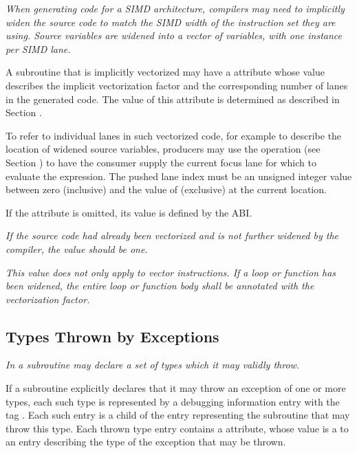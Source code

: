 \textit{When generating code for a SIMD architecture, compilers
may need to implicitly widen the source code to match the SIMD
width of the instruction set they are using. Source variables
are widened into a vector of variables, with one instance per
SIMD lane.}

A subroutine that is implicitly vectorized may have a
\DWATnumlanes{} attribute whose value describes the implicit
vectorization factor and the corresponding number of lanes in
the generated code. The value of this attribute is determined as
described in Section .

To refer to individual lanes in such vectorized code, for example
to describe the location of widened source variables, producers
may use the \DWOPpushlane{} operation (see Section
) to have the consumer supply
the current focus lane for which to evaluate the expression.
The pushed lane index must be an unsigned integer value between
zero (inclusive) and the value of \DWATnumlanes{} (exclusive)
at the current location.

If the attribute is omitted, its value is defined by the ABI.

\textit{If the source code had already been vectorized and is
not further widened by the compiler, the value should be one.}

\textit{This value does not only apply to vector instructions.
If a loop or function has been widened, the entire loop or
function body shall be annotated with the vectorization factor.}
\eb

\subsection{Types Thrown by Exceptions}
\label{chap:typesthrownbyexceptions}

\textit{In  a subroutine may declare a set of types which
it may validly throw.}

If a subroutine explicitly declares that it may throw
an
exception of one or more types, each such type is
represented by a debugging information entry with
the tag
\DWTAGthrowntypeTARG.
Each such entry is a child of the entry
representing the subroutine that may throw this type. Each
thrown type entry contains
a \DWATtype{} attribute, whose
value is a 
to an entry describing the type of the
exception that may be thrown.

